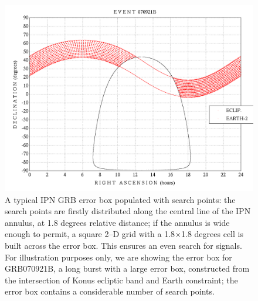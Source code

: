 \begin{figure}[htb]
\begin{center}
\includegraphics[width=32pc]{Images/ipn_search.png}
\caption{\label{ipn_search} A typical IPN GRB error box populated with search points: the search points are firstly distributed along the central line of the IPN annulus, at 1.8 degrees relative distance; if the annulus is wide enough to permit, a square 2--D grid with a 1.8$\times$1.8 degrees cell is built across the error box. This ensures an even search for signals. For illustration purposes only, we are showing the error box for GRB070921B, a long burst with a large error box, constructed from the intersection of Konus ecliptic band and Earth constraint; the error box contains a considerable number of search points.}
\end{center}
\end{figure}


